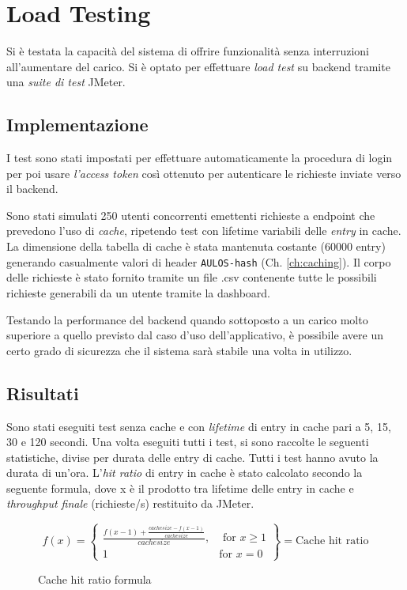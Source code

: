 \chapter{Load Testing}
\label{ch:stresstesting}
Si è testata la capacità del sistema di offrire funzionalità senza interruzioni all'aumentare del carico. 
Si è optato per effettuare\textit{ load test} su backend tramite una \textit{suite di test} JMeter. \cite{JMETER}

\section{Implementazione}

I test sono stati impostati per effettuare automaticamente la procedura di login per poi usare \textit{l'access token} così ottenuto per autenticare le richieste inviate verso il backend.

Sono stati simulati 250 utenti concorrenti emettenti richieste a endpoint che prevedono l'uso di \textit{cache}, ripetendo test con lifetime variabili delle \textit{entry} in cache.
La dimensione della tabella di cache è stata mantenuta costante (60000 entry) generando casualmente valori di header \verb|AULOS-hash| (Ch. \ref{ch:caching}).
Il corpo delle richieste è stato fornito tramite un file .csv contenente tutte le possibili richieste generabili da un utente tramite la dashboard.

Testando la performance del backend quando sottoposto a un carico molto superiore a quello previsto dal caso d'uso dell'applicativo, è possibile avere un certo grado di sicurezza che il sistema sarà stabile una volta in utilizzo.

\section{Risultati}
Sono stati eseguiti test senza cache e con \textit{lifetime} di entry in cache pari a 5, 15, 30 e 120 secondi. 
Una volta eseguiti tutti i test, si sono raccolte le seguenti statistiche, divise per durata delle entry di cache. Tutti i test hanno avuto la durata di un'ora.
L'\textit{hit ratio} di entry in cache è stato calcolato secondo la seguente formula, dove x è il prodotto tra lifetime delle entry in cache e \textit{throughput finale} (richieste/s) restituito da JMeter.
\begin{figure}[h!]

\begin{Large}
  \[
    f(x) = \left\{\begin{array}{lr}
        \frac{f(x-1)+\frac{cachesize - f(x-1)}{cachesize}}{cachesize}, & \text{ for } x\geq 1\\
        1 & \text{for } x=0
        \end{array}\right\} = \text{Cache hit ratio}
  \]
\caption{Cache hit ratio formula}
\label{fig:formula}
\end{Large}

\end{figure}
\FloatBarrier

